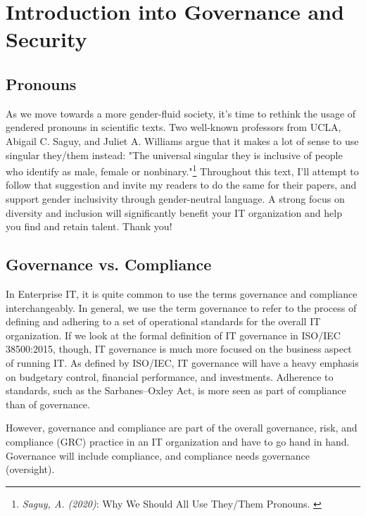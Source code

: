 %
%

\pagebreak
\section{Introduction into Governance and Security}

\onehalfspacing

\subsection{Pronouns}

As we move towards a more gender-fluid society, it's time to rethink the usage of gendered pronouns in scientific texts. Two well-known professors from UCLA, Abigail C. Saguy, and Juliet A. Williams argue that it makes a lot of sense to use singular they/them instead: "The universal singular they is inclusive of people who identify as male, female or nonbinary."\footnote{\textit{Saguy, A. (2020)}: Why We Should All Use They/Them Pronouns. \cite{pronouns}} Throughout this text, I'll attempt to follow that suggestion and invite my readers to do the same for their papers, and support gender inclusivity through gender-neutral language. A strong focus on diversity and inclusion will significantly benefit your IT organization and help you find and retain talent. Thank you!

\subsection{Governance vs. Compliance}

In Enterprise IT, it is quite common to use the terms governance and compliance interchangeably. In general, we use the term governance to refer to the process of defining and adhering to a set of operational standards for the overall IT organization. If we look at the formal definition of IT governance in ISO/IEC 38500:2015, though, IT governance is much more focused on the business aspect of running IT. As defined by ISO/IEC, IT governance will have a heavy emphasis on budgetary control, financial performance, and investments. Adherence to standards, such as the Sarbanes–Oxley Act, is more seen as part of compliance than of governance.

However, governance and compliance are part of the overall governance, risk, and compliance (GRC) practice in an IT organization and have to go hand in hand. Governance will include compliance, and compliance needs governance (oversight).

